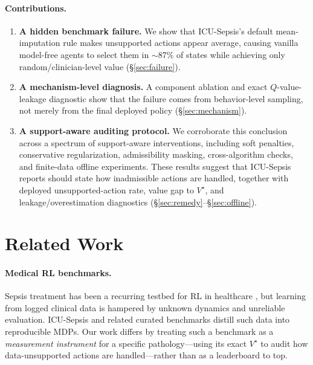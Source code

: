 \documentclass{article}
\begin{document}
\paragraph{Contributions.}
\begin{enumerate}[leftmargin=2em,itemsep=2pt,topsep=2pt]
  \item \textbf{A hidden benchmark failure.} We show that ICU-Sepsis's default
  mean-imputation rule makes unsupported actions appear average, causing vanilla
  model-free agents to select them in $\sim$87\% of states while achieving only
  random/clinician-level value (\S\ref{sec:failure}).
  \item \textbf{A mechanism-level diagnosis.} A component ablation and exact
  $Q$-value-leakage diagnostic show that the failure comes from behavior-level
  sampling, not merely from the final deployed policy (\S\ref{sec:mechanism}).
  \item \textbf{A support-aware auditing protocol.} We corroborate this conclusion
  across a spectrum of support-aware interventions, including soft penalties,
  conservative regularization, admissibility masking, cross-algorithm checks, and
  finite-data offline experiments. These results suggest that ICU-Sepsis reports
  should state how inadmissible actions are handled, together with deployed
  unsupported-action rate, value gap to $V^\star$, and leakage/overestimation
  diagnostics (\S\ref{sec:remedy}--\S\ref{sec:offline}).
\end{enumerate}

\section{Related Work}
\label{sec:related}
\paragraph{Medical RL benchmarks.}
Sepsis treatment has been a recurring testbed for RL in healthcare
\citep{komorowski2018aiclinician,raghu2017continuous}, but learning from logged
clinical data is hampered by unknown dynamics and unreliable evaluation.
ICU-Sepsis \citep{choudhary2024icusepsis} and related curated benchmarks
\citep{mimic_sepsis_arxiv2510_24500} distill such data into reproducible MDPs.
Our work differs by treating such a benchmark as a \emph{measurement instrument}
for a specific pathology---using its exact $V^\star$ to audit how data-unsupported
actions are handled---rather than as a leaderboard to top.
\end{document}
